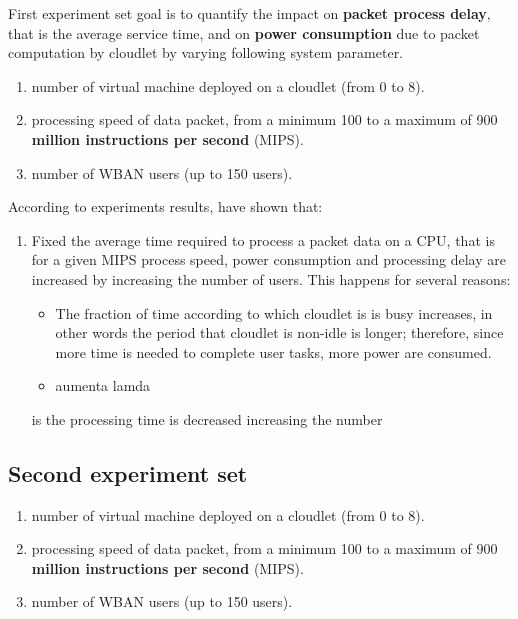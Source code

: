 \documentclass[sigchi]{acmart}
\begin{document}
First experiment set goal is to quantify the impact on \textbf{packet process delay}, that is the average service time, and on \textbf{power consumption} due to packet computation by cloudlet by varying following system parameter.

\begin{enumerate}
\item number of virtual machine deployed on a cloudlet (from 0 to 8).
\item processing speed of data packet, from a minimum 100 to a maximum of 900 \textbf{million instructions per second} (MIPS).
\item number of WBAN users (up to 150 users).
\end{enumerate}

According to experiments results, \cite{MSAReport} have shown that:

\begin{enumerate}

\item Fixed the average time required to process a packet data on a CPU, that is for a given MIPS process speed, power consumption and processing delay are increased by increasing the number of users. This happens for several reasons:

\begin{itemize}
\item The fraction of time according to which cloudlet is is busy increases, in other words the period that cloudlet is non-idle is longer; therefore, since more time is needed to complete user tasks, more power are consumed.

\item aumenta lamda
\end{itemize} 

is the processing time is decreased increasing the number 



\end{enumerate}





\subsection{Second experiment set}



\begin{enumerate}
\item number of virtual machine deployed on a cloudlet (from 0 to 8).
\item processing speed of data packet, from a minimum 100 to a maximum of 900 \textbf{million instructions per second} (MIPS).
\item number of WBAN users (up to 150 users).
\end{enumerate}
\end{document}
